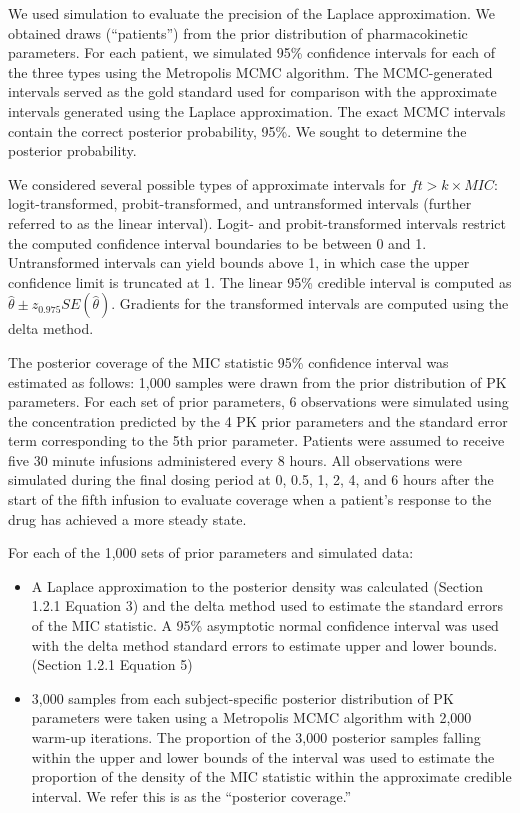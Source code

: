 \documentclass{article}\usepackage[]{graphicx}\usepackage[]{color}
\newcommand{\mic}{$ft > k \times MIC$}
\begin{document}
We used simulation to evaluate the precision of the Laplace approximation. We obtained draws (``patients'') from the prior distribution of pharmacokinetic parameters. For each patient, we simulated 95\% confidence intervals for each of the three types using the Metropolis MCMC algorithm. The MCMC-generated intervals served as the gold standard used for comparison with the approximate intervals generated using the Laplace approximation. The exact MCMC intervals contain the correct posterior probability, 95\%. We sought to determine the posterior probability.

We considered several possible types of approximate intervals for \mic: logit-transformed, probit-transformed, and untransformed intervals (further referred to as the linear interval). Logit- and probit-transformed intervals restrict the computed confidence interval boundaries to be between 0 and 1. Untransformed intervals can yield bounds above 1, in which case the upper confidence limit is truncated at 1. The linear 95\% credible interval is computed as $\hat{\theta} \pm z_{0.975} SE(\hat{\theta})$. Gradients for the transformed intervals are computed using the delta method.

The posterior coverage of the MIC statistic 95\% confidence interval was estimated as follows: 1,000 samples were drawn from the prior distribution of PK parameters. For each set of prior parameters, 6 observations were simulated using the concentration predicted by the 4 PK prior parameters and the standard error term corresponding to the 5th prior parameter. Patients were assumed to receive five 30 minute infusions administered every 8 hours. All observations were simulated during the final dosing period at 0, 0.5, 1, 2, 4, and 6 hours after the start of the fifth infusion to evaluate coverage when a patient's response to the drug has achieved a more steady state.

For each of the 1,000 sets of prior parameters and simulated data:

\begin{itemize}
	 \item A Laplace approximation to the posterior density was calculated (Section 1.2.1 Equation 3) and the delta method used to estimate the standard errors of the MIC statistic. A 95\% asymptotic normal confidence interval was used with the delta method standard errors to estimate upper and lower bounds. (Section 1.2.1 Equation 5)
	 \item 3,000 samples from each subject-specific posterior distribution of PK parameters were taken using a Metropolis MCMC algorithm with 2,000 warm-up iterations. The proportion of the 3,000 posterior samples falling within the upper and lower bounds of the interval was used to estimate the proportion of the density of the MIC statistic within the approximate credible interval. We refer this is as the ``posterior coverage.''
\end{itemize}
\end{document}
